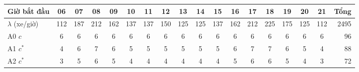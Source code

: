 \begin{tabular}{lccccccccccccccccr}
\toprule
\textbf{Giờ bắt đầu} & 06 & 07 & 08 & 09 & 10 & 11 & 12 & 13 & 14 & 15 & 16 & 17 & 18 & 19 & 20 & 21 & \textbf{Tổng} \\
\midrule
$\lambda$ (xe/giờ) & 112 & 187 & 212 & 162 & 137 & 137 & 150 & 125 & 125 & 137 & 162 & 212 & 225 & 175 & 125 & 112 & 2495 \\
A0 $c$ & 6 & 6 & 6 & 6 & 6 & 6 & 6 & 6 & 6 & 6 & 6 & 6 & 6 & 6 & 6 & 6 & 96 \\
A1 $c^*$ & 4 & 6 & 7 & 6 & 5 & 5 & 5 & 5 & 5 & 5 & 6 & 7 & 7 & 6 & 5 & 4 & 88 \\
A2 $c^*$ & 3 & 5 & 6 & 5 & 4 & 4 & 4 & 4 & 4 & 4 & 5 & 6 & 6 & 5 & 4 & 3 & 72 \\
\bottomrule
\end{tabular}
